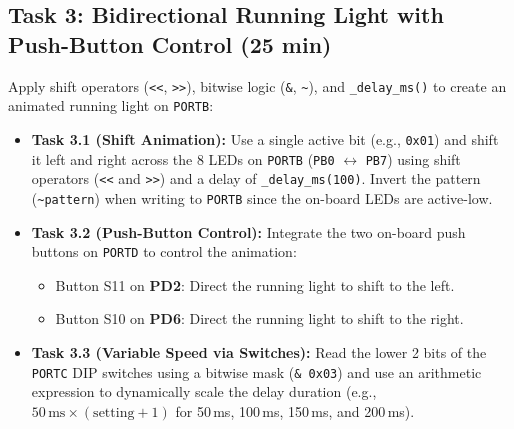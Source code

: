 \documentclass[11pt,a4paper]{article}
\begin{document}
\subsection*{Task 3: Bidirectional Running Light with Push-Button Control (25 min)}
Apply shift operators (\texttt{<<}, \texttt{>>}), bitwise logic (\texttt{\&}, \texttt{\textasciitilde}), and \texttt{\_delay\_ms()} to create an animated running light on \texttt{PORTB}:
\begin{itemize}
  \item \textbf{Task 3.1 (Shift Animation):} Use a single active bit (e.g., \texttt{0x01}) and shift it left and right across the 8 LEDs on \texttt{PORTB} (\texttt{PB0} $\leftrightarrow$ \texttt{PB7}) using shift operators (\texttt{<<} and \texttt{>>}) and a delay of \texttt{\_delay\_ms(100)}. Invert the pattern (\texttt{\textasciitilde pattern}) when writing to \texttt{PORTB} since the on-board LEDs are active-low.
  \item \textbf{Task 3.2 (Push-Button Control):} Integrate the two on-board push buttons on \texttt{PORTD} to control the animation:
    \begin{itemize}
      \item Button S11 on \textbf{PD2}: Direct the running light to shift to the left.
      \item Button S10 on \textbf{PD6}: Direct the running light to shift to the right.
    \end{itemize}
  \item \textbf{Task 3.3 (Variable Speed via Switches):} Read the lower 2 bits of the \texttt{PORTC} DIP switches using a bitwise mask (\texttt{\& 0x03}) and use an arithmetic expression to dynamically scale the delay duration (e.g., $50\,\text{ms} \times (\text{setting} + 1)$ for 50\,ms, 100\,ms, 150\,ms, and 200\,ms).
\end{itemize}
\end{document}
